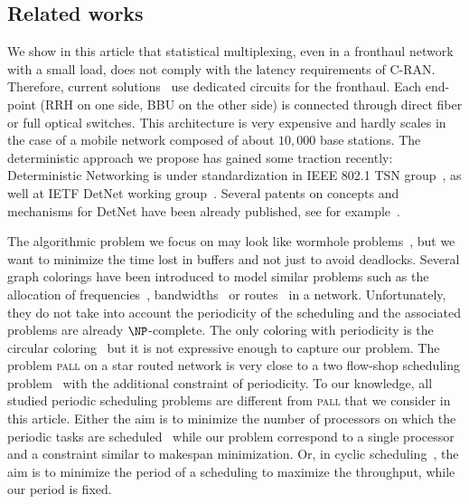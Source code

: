 \documentclass[a4paper,10pt]{journal}
\newcommand\pall{\textsc{pall}\xspace}
\begin{document}
 \subsection*{Related works}

  We show in this article that statistical multiplexing, even in a fronthaul network with a small load, does not comply with the latency requirements of C-RAN. Therefore, current solutions~\cite{pizzinat2015things,tayq2017real}  use dedicated circuits for the fronthaul. Each end-point (RRH on one side, BBU on the other side) is connected through direct fiber or full optical switches. This architecture is very expensive and hardly scales in the case of a mobile network composed of about $10,000$ base stations. The deterministic approach we propose has gained some traction recently: Deterministic Networking is under standardization in IEEE 802.1 TSN group~\cite{finn-detnet-architecture-08}, as well at IETF DetNet working group~\cite{ieee802}. Several patents on concepts and mechanisms for DetNet have been already published, see for example~\cite{howe2005time,leclerc2016transmission}. 
     
The algorithmic problem we focus on may look like wormhole problems~\cite{cole1996benefit}, but we want to minimize the time lost in buffers and not just to avoid deadlocks. Several graph colorings have been introduced to model similar problems such as the allocation of frequencies~\cite{borndorfer1998frequency}, bandwidths~\cite{erlebach2001complexity} or routes~\cite{cole1996benefit} in a network. Unfortunately, they do not take into account the periodicity of the scheduling and the associated problems are already $\NP$-complete. The only coloring with periodicity is the circular coloring~\cite{zhou2013multiple} but it is not expressive enough to capture our problem. 
The problem \pall on a star routed network is very close to a two flow-shop scheduling problem~\cite{yu2004minimizing} with the additional constraint of periodicity. To our knowledge, all studied periodic scheduling problems are different from \pall that we consider in this article. 
Either the aim is to minimize the number of processors on which the periodic tasks are scheduled~\cite{korst1991periodic,hanen1993cyclic} while our problem correspond to a single processor and a constraint similar to makespan minimization. Or, in cyclic scheduling~\cite{levner2010complexity}, the aim is to minimize the period of a scheduling to maximize the throughput, while our period is fixed. 
\end{document}
